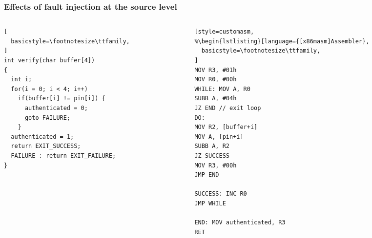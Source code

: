 
\begin{frame}[fragile] \frametitle{Effects of fault injection at the source level}
\begin{columns}[t]
\begin{column}{0.50\textwidth}
\begin{lstlisting}[
  basicstyle=\footnotesize\ttfamily,
]
int verify(char buffer[4]) 
{
  int i;
  for(i = 0; i < 4; i++)
    if(buffer[i] != pin[i]) {
      authenticated = 0;
      goto FAILURE;
    }
  authenticated = 1;
  return EXIT_SUCCESS;
  FAILURE : return EXIT_FAILURE;
}
\end{lstlisting}
\end{column}
\begin{column}{0.48\textwidth}
\begin{lstlisting}[style=customasm,
%\begin{lstlisting}[language={[x86masm]Assembler},
  basicstyle=\footnotesize\ttfamily,
]
MOV R3, #01h 
MOV R0, #00h
WHILE: MOV A, R0
SUBB A, #04h
JZ END // exit loop
DO:
MOV R2, [buffer+i] 
MOV A, [pin+i] 
SUBB A, R2 
JZ SUCCESS 
MOV R3, #00h
JMP END

SUCCESS: INC R0
JMP WHILE

END: MOV authenticated, R3
RET
\end{lstlisting}

\end{column}
\end{columns}
\end{frame}


